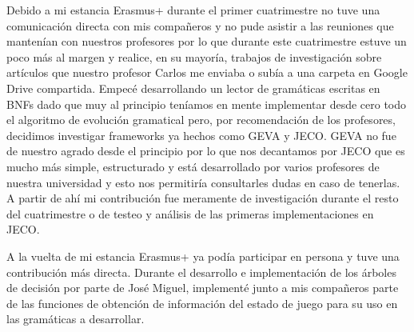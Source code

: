 Debido a mi estancia Erasmus+ durante el primer cuatrimestre no tuve una comunicación directa con mis compañeros y no pude asistir a las reuniones que mantenían con nuestros profesores por lo que durante este cuatrimestre estuve un poco más al margen y realice, en su mayoría, trabajos de investigación sobre artículos que nuestro profesor Carlos me enviaba o subía a una carpeta en Google Drive compartida. Empecé desarrollando un lector de gramáticas escritas en BNFs dado que muy al principio teníamos en mente implementar desde cero todo el algoritmo de evolución gramatical pero, por recomendación de los profesores, decidimos investigar frameworks ya hechos como GEVA y JECO. GEVA no fue de nuestro agrado desde el principio por lo que nos decantamos por JECO que es mucho más simple, estructurado y está desarrollado por varios profesores de nuestra universidad y esto nos permitiría consultarles dudas en caso de tenerlas. A partir de ahí mi contribución fue meramente de investigación durante el resto del cuatrimestre o de testeo y análisis de las primeras implementaciones en JECO.

A la vuelta de mi estancia Erasmus+ ya podía participar en persona y tuve una contribución más directa. Durante el desarrollo e implementación de los árboles de decisión por parte de José Miguel, implementé junto a mis compañeros parte de las funciones de obtención de información del estado de juego para su uso en las gramáticas a desarrollar.

